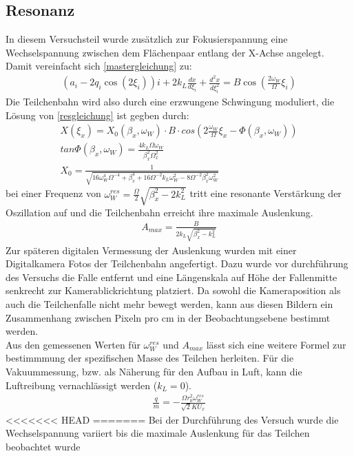 \documentclass[a4paper,12pt]{article}
\begin{document}
\subsection{Resonanz}
In diesem Versuchsteil wurde zusätzlich zur Fokusierspannung  eine Wechselspannung zwischen dem Flächenpaar entlang der X-Achse angelegt. Damit vereinfacht sich \ref{mastergleichung} zu: 
\begin{align}\label{resgleichung}
	\left( a_i -2q_i \cos\left( 2\xi_i \right) \right) i  + 2k_L \frac{dx}{d\xi_i} + \frac{d^2x}{d\xi_i^2} = B\cos\left( \frac{2ω_W}{Ω}ξ_i \right)
\end{align}
Die Teilchenbahn wird also durch eine erzwungene Schwingung moduliert, die Lösung von \ref{resgleichung} ist gegben durch:
\begin{align}\label{resgleichung}
	X(\xi_x) = X_0( \beta_x,\omega_W ) \cdot B \cdot cos(2\frac{\omega_W}{\Omega}\xi_x - \Phi(\beta_x,\omega_W))
	\\
	 tan\Phi(\beta_x,\omega_W) = \frac{4 k_L \Omega \omega_W}{\beta_x^{2}\Omega_x^{2}} 
	 \\
	  X_0 = \frac{1}{\sqrt{16\omega^{4}_W\Omega^{-4}+\beta^{4}_x+16\Omega^{-2}k_L\omega^{2}_W-8\Omega^{-2}\beta^{2}_x\omega^{2}_W}}
\end{align}
bei einer Frequenz von $\omega^{res}_W = \frac{\Omega}{2}\sqrt{\beta^{2}_x-2k^{2}_L} $ tritt eine resonante 
Verstärkung der Oszillation auf und die Teilchenbahn erreicht ihre maximale Auslenkung.
\begin{align*}\label{Amax}
	A_{max} = \frac{B}{2k_L\sqrt{\beta^{2}_x-k^{2}_L}}
\end{align*}
Zur späteren digitalen Vermessung der Auslenkung wurden mit einer Digitalkamera Fotos der Teilchenbahn angefertigt.
Dazu wurde vor durchführung des Versuchs die Falle entfernt und eine Längenskala auf Höhe der Fallenmitte senkrecht zur Kamerablickrichtung platziert.  
Da sowohl die Kameraposition als auch die Teilchenfalle nicht mehr bewegt werden, kann aus diesen Bildern ein Zusammenhang zwischen Pixeln pro cm in der Beobachtungsebene 
bestimmt werden.
\\
Aus den gemessenen Werten für $\omega^{res}_W$ und $A_{max}$ lässt sich eine weitere Formel zur bestimmmung der spezifischen Masse des Teilchen herleiten. 
Für die Vakuummessung, bzw. als Näherung für den Aufbau in Luft, kann die Luftreibung vernachlässigt werden ($k_L = 0$).  
\begin{align*}\label{resspezm}
	\frac{q}{m} = -\frac{\Omega r^{2}_0 \omega^{res}_W}{\sqrt{2} K U_x}
\end{align*}
<<<<<<< HEAD
=======
Bei der Durchführung des Versuch wurde die Wechselspannung variiert bis die maximale Auslenkung für das Teilchen beobachtet wurde 
\end{document}
